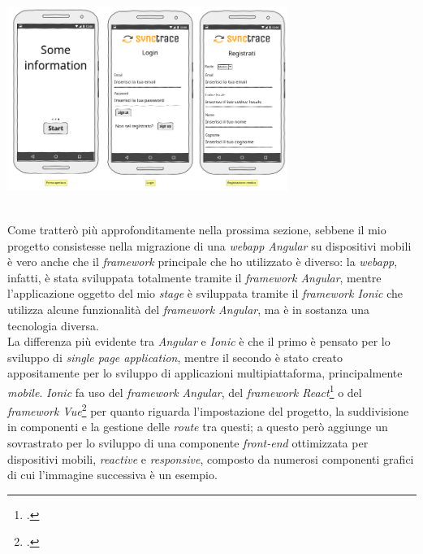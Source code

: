 \begin{minipage}{\linewidth}
  \centering
    \includegraphics[height=6cm]{immagini/appsketch}
\end{minipage} \\

Come tratterò più approfonditamente nella prossima sezione, sebbene il mio progetto consistesse nella migrazione di una \textit{webapp Angular} su dispositivi mobili è vero anche che il \textit{framework} principale che ho utilizzato è diverso: la \textit{webapp}, infatti, è stata sviluppata totalmente tramite il \textit{framework Angular}, mentre l'applicazione oggetto del mio \textit{stage} è sviluppata tramite il \textit{framework Ionic} che utilizza alcune funzionalità del \textit{framework Angular}, ma è in sostanza una tecnologia diversa. \\
La differenza più evidente tra \textit{Angular} e \textit{Ionic} è che il primo è pensato per lo sviluppo di \textit{single page application}, mentre il secondo è stato creato appositamente per lo sviluppo di applicazioni multipiattaforma, principalmente \textit{mobile}. \textit{Ionic} fa uso del \textit{framework Angular}, del \textit{framework React}\footcite{tec:react} o del \textit{framework Vue}\footcite{tec:vue} per quanto riguarda l'impostazione del progetto, la suddivisione in componenti e la gestione delle \textit{route} tra questi; a questo però aggiunge un sovrastrato per lo sviluppo di una componente \textit{front-end} ottimizzata per dispositivi mobili, \textit{reactive} e \textit{responsive}, composto da numerosi componenti grafici di cui l'immagine successiva è un esempio. \\

